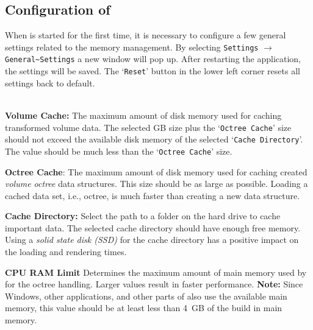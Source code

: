 \subsection{Configuration of \Voreen}
\label{section:configuration}
When \Voreen is started for the first time, it is necessary to configure a few general settings related to the memory management. By selecting \verb|Settings| $\rightarrow$ \verb|General~Settings| a new window will pop up. After restarting the application, the settings will be saved. 
The `\verb|Reset|' button in the lower left corner resets all settings back to default.\\
\\
\begin{minipage}[h]{\textwidth}
	\begingroup
	\parfillskip=0pt
	\begin{minipage}[h]{0.58\textwidth}
		\textbf{Volume Cache:} The maximum amount of disk memory used for caching transformed volume data. 
		The selected GB size plus the `\verb|Octree Cache|' size should not exceed the available disk memory of the selected `\verb|Cache Directory|'. 
		The value should be much less than the `\verb|Octree Cache|' size.
		
		\textbf{Octree Cache}: The maximum amount of disk memory used for caching created \emph{volume octree} data structures. 
		This size should be as large as possible. Loading a cached data set, {i.e.}, octree, is much faster than creating a new data structure.
		 
		\textbf{Cache Directory:} Select the path to a folder on the hard drive to cache important data. 
		The selected cache directory should have enough free memory. 
		Using a \emph{solid state disk (SSD)} for the cache directory has a positive impact on the loading and rendering times.
		 
		\textbf{CPU RAM Limit} Determines the maximum amount of main memory used by \Voreen for the octree handling. 
		Larger values result in faster performance. \textbf{Note:} Since Windows, other applications, and other parts of \Voreen also use the available main memory, 
		this value should be at least less than 4~GB of the build in main memory.
		  

\end{minipage}
\end{minipage}
